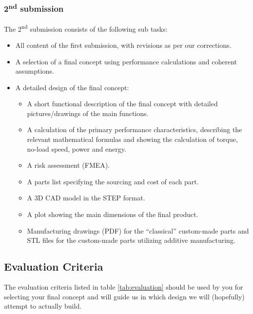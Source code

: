 \documentclass[headinclude=true]{scrartcl}
\begin{document}
\subsubsection{2\textsuperscript{nd} submission}
The 2\textsuperscript{nd} submission consists of the following sub tasks:
\begin{itemize}
 \item All content of the first submission, with revisions as per our corrections.
 \item A selection of a final concept using performance calculations and coherent assumptions.
 \item A detailed design of the final concept:
 \begin{itemize}
  \item A short functional description of the final concept with detailed pictures/drawings of the main functions.
  \item A calculation of the primary performance characteristics, describing the relevant mathematical formulas and showing the calculation of torque, no-load speed, power and energy.
  \item A risk assessment (FMEA).
  \item A parts list specifying the sourcing and cost of each part.
  \item A 3D CAD model in the STEP format.
  \item A plot showing the main dimensions of the final product.
  \item Manufacturing drawings (PDF) for the ``classical'' custom-made parts and STL files for the custom-made parts utilizing additive manufacturing.
 \end{itemize}

\end{itemize}

\subsection{Evaluation Criteria}
\label{sec:evaluation}

The evaluation criteria listed in table \ref{tab:evaluation} should be used by you for selecting your final concept and will guide us in which design we will (hopefully) attempt to actually build.
\end{document}
